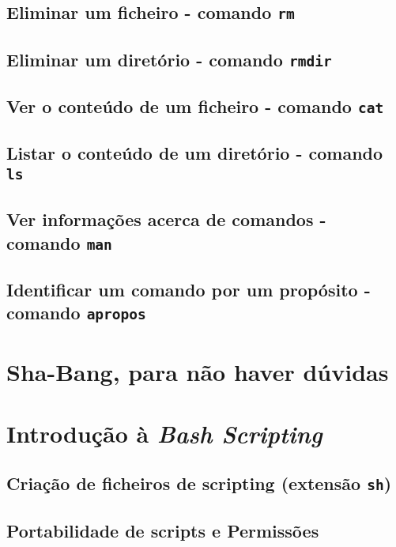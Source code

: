 \documentclass[a4paper, onecolumn, 10pt]{report}
\begin{document}
\subsection{Eliminar um ficheiro - comando \texttt{rm}}

\subsection{Eliminar um diretório - comando \texttt{rmdir}}

\subsection{Ver o conteúdo de um ficheiro - comando \texttt{cat}}

\subsection{Listar o conteúdo de um diretório - comando \texttt{ls}}

\subsection{Ver informações acerca de comandos - comando \texttt{man}}

\subsection{Identificar um comando por um propósito - comando \texttt{apropos}}

\section{Sha-Bang, para não haver dúvidas}

\section{Introdução à \textit{Bash Scripting}}

\subsection{Criação de ficheiros de scripting (extensão \texttt{sh})}

\subsection{Portabilidade de scripts e Permissões}
\end{document}
